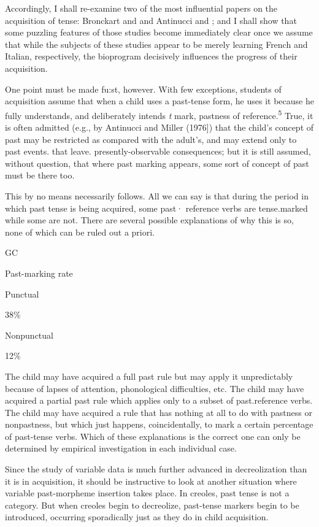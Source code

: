 Accordingly, I shall re-examine two of the most influential papers on the acquisition of tense: Bronckart and \citet{Sinclair1973} and Antinucci and \citet{Miller1976}; and I shall show that some puzzling features of those studies become immediately clear once we assume that while the subjects of these studies appear to be merely learning French and Italian, respectively, the bioprogram decisively influences the progress of their acquisition.

One point must be made fu:st, however. With few exceptions, students of acquisition assume that when a child uses a past-tense form, he uses it because he fully understands, and deliberately intends \textit{t} mark, pastness of reference.\textsuperscript{5} True, it is often admitted (e.g., by Antinucci and Miller (1976]) that the child's concept of past may be restricted as compared with the adult's, and may extend only to past events. that leave. presently-observable consequences; but it is still assumed, without question, that where past marking appears, some sort of concept of past must be there too.

This by no means necessarily follows. All we can say is that
during the period in which past tense is being acquired, some past· reference verbs are tense.marked while some are not. There are several possible explanations of why this is so, none of which can be ruled
out a priori.

\begin{table}
GC

Past-marking rate

Punctual

38\%

Nonpunctual

12\%
\end{table}
 
The child may have acquired a full past rule but may
apply it unpredictably because of lapses of attention, phonological difficulties, etc. The child may have acquired a partial past rule which applies only to a subset of past.reference verbs. The child may have acquired a rule that has nothing at all to do with pastness or non\-pastness, but which just happens, coincidentally, to mark a certain percentage of past-tense verbs. Which of these explanations is the correct one can only be determined by empirical investigation in each individual case.

Since the study of variable data is much further advanced in decreolization than it is in acquisition, it should be instructive to look at another situation where variable past-morpheme insertion takes place. In creoles, past tense is not a category. But when creoles begin to decreolize, past-tense markers begin to be introduced, occurring sporadically just as they do in child acquisition.

